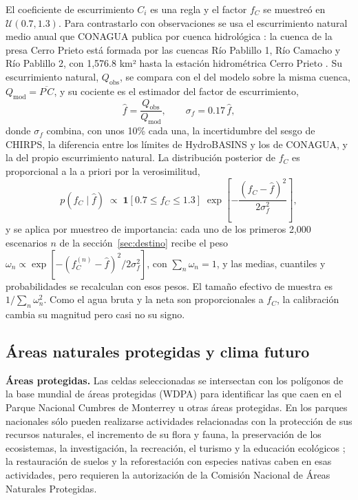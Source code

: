 El coeficiente de escurrimiento $C_i$ es una regla y el factor $f_C$ se muestreó en $\mathcal U(0.7,1.3)$. Para contrastarlo con observaciones se usa el escurrimiento natural medio anual que CONAGUA publica por cuenca hidrológica : la cuenca de la presa Cerro Prieto está formada por las cuencas Río Pablillo 1, Río Camacho y Río Pablillo 2, con 1,576.8 km² hasta la estación hidrométrica Cerro Prieto . Su escurrimiento natural, $Q_{\text{obs}}$, se compara con el del modelo sobre la misma cuenca, $Q_{\text{mod}}=\overline{P\,C}$, y su cociente es el estimador del factor de escurrimiento,
\begin{equation}
\hat f=\frac{Q_{\text{obs}}}{Q_{\text{mod}}},\qquad \sigma_f=0.17\,\hat f,
\end{equation}
donde $\sigma_f$ combina, con unos 10\% cada una, la incertidumbre del sesgo de CHIRPS, la diferencia entre los límites de HydroBASINS y los de CONAGUA, y la del propio escurrimiento natural. La distribución posterior de $f_C$ es proporcional a la a priori por la verosimilitud,
\begin{equation}
p(f_C\mid \hat f)\;\propto\;\mathbf 1[0.7\le f_C\le1.3]\;\exp\!\left[-\frac{(f_C-\hat f)^2}{2\sigma_f^2}\right],
\end{equation}
y se aplica por muestreo de importancia: cada uno de los primeros 2,000 escenarios $n$ de la sección~\ref{sec:destino} recibe el peso $\omega_n\propto\exp[-(f_C^{(n)}-\hat f)^2/2\sigma_f^2]$, con $\sum_n\omega_n=1$, y las medias, cuantiles y probabilidades se recalculan con esos pesos. El tamaño efectivo de muestra es $1/\sum_n\omega_n^2$. Como el agua bruta y la neta son proporcionales a $f_C$, la calibración cambia su magnitud pero casi no su signo.

\subsection{Áreas naturales protegidas y clima futuro}\label{sec:anp_clima}

\textbf{Áreas protegidas.} Las celdas seleccionadas se intersectan con los polígonos de la base mundial de áreas protegidas (WDPA)  para identificar las que caen en el Parque Nacional Cumbres de Monterrey u otras áreas protegidas. En los parques nacionales sólo pueden realizarse actividades relacionadas con la protección de sus recursos naturales, el incremento de su flora y fauna, la preservación de los ecosistemas, la investigación, la recreación, el turismo y la educación ecológicos ; la restauración de suelos y la reforestación con especies nativas caben en esas actividades, pero requieren la autorización de la Comisión Nacional de Áreas Naturales Protegidas.

